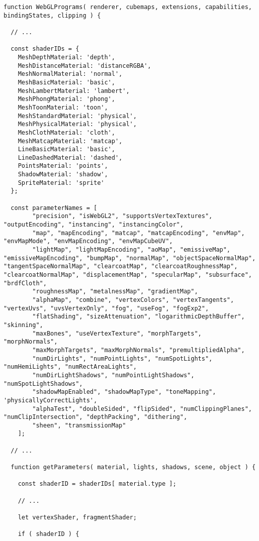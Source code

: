 \begin{lstlisting}[caption=Clase MeshClothMaterial]
function WebGLPrograms( renderer, cubemaps, extensions, capabilities, bindingStates, clipping ) {

  // ...

  const shaderIDs = {
    MeshDepthMaterial: 'depth',
    MeshDistanceMaterial: 'distanceRGBA',
    MeshNormalMaterial: 'normal',
    MeshBasicMaterial: 'basic',
    MeshLambertMaterial: 'lambert',
    MeshPhongMaterial: 'phong',
    MeshToonMaterial: 'toon',
    MeshStandardMaterial: 'physical',
    MeshPhysicalMaterial: 'physical',
    MeshClothMaterial: 'cloth',
    MeshMatcapMaterial: 'matcap',
    LineBasicMaterial: 'basic',
    LineDashedMaterial: 'dashed',
    PointsMaterial: 'points',
    ShadowMaterial: 'shadow',
    SpriteMaterial: 'sprite'
  };

  const parameterNames = [
		"precision", "isWebGL2", "supportsVertexTextures", "outputEncoding", "instancing", "instancingColor",
		"map", "mapEncoding", "matcap", "matcapEncoding", "envMap", "envMapMode", "envMapEncoding", "envMapCubeUV",
		"lightMap", "lightMapEncoding", "aoMap", "emissiveMap", "emissiveMapEncoding", "bumpMap", "normalMap", "objectSpaceNormalMap", "tangentSpaceNormalMap", "clearcoatMap", "clearcoatRoughnessMap", "clearcoatNormalMap", "displacementMap", "specularMap", "subsurface", "brdfCloth",
		"roughnessMap", "metalnessMap", "gradientMap",
		"alphaMap", "combine", "vertexColors", "vertexTangents", "vertexUvs", "uvsVertexOnly", "fog", "useFog", "fogExp2",
		"flatShading", "sizeAttenuation", "logarithmicDepthBuffer", "skinning",
		"maxBones", "useVertexTexture", "morphTargets", "morphNormals",
		"maxMorphTargets", "maxMorphNormals", "premultipliedAlpha",
		"numDirLights", "numPointLights", "numSpotLights", "numHemiLights", "numRectAreaLights",
		"numDirLightShadows", "numPointLightShadows", "numSpotLightShadows",
		"shadowMapEnabled", "shadowMapType", "toneMapping", 'physicallyCorrectLights',
		"alphaTest", "doubleSided", "flipSided", "numClippingPlanes", "numClipIntersection", "depthPacking", "dithering",
		"sheen", "transmissionMap"
	];

  // ...

  function getParameters( material, lights, shadows, scene, object ) {

    const shaderID = shaderIDs[ material.type ];

    // ...

    let vertexShader, fragmentShader;

    if ( shaderID ) {


\end{lstlisting}
